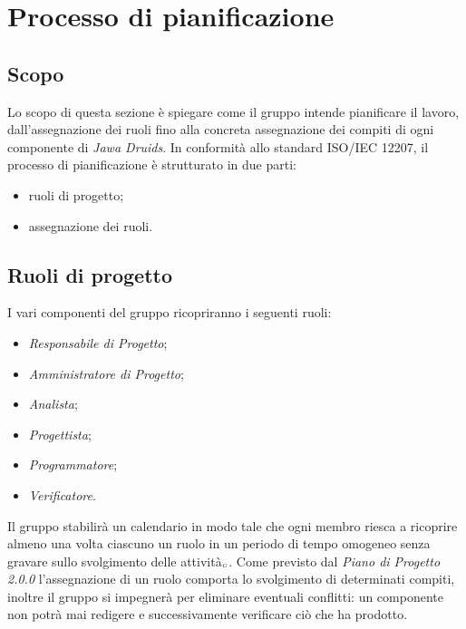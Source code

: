 \section{Processo di pianificazione}\label{ProcessiOrganizzativiProcessoDiPianificazione}

\subsection{Scopo}\label{ProcessiOrganizzativiProcessoDiPianificazioneScopo}

Lo scopo di questa sezione è spiegare come il gruppo intende pianificare il lavoro, dall'assegnazione dei ruoli fino alla concreta assegnazione dei compiti di ogni componente di \textit{Jawa Druids}. In conformità allo standard ISO/IEC 12207, il processo di pianificazione è strutturato in due parti:
\begin{itemize}
	\item ruoli di progetto;
	\item assegnazione dei ruoli.
\end{itemize}

\subsection{Ruoli di progetto}\label{ProcessiOrganizzativiProcessoDiPianificazioneRuoliDiProgetto}

I vari componenti del gruppo ricopriranno i seguenti ruoli:
\begin{itemize}
	\item \textit{Responsabile di Progetto};
	\item \textit{Amministratore di Progetto};
	\item \textit{Analista};
	\item \textit{Progettista};
	\item \textit{Programmatore};
	\item \textit{Verificatore}.
\end{itemize}

Il gruppo stabilirà un calendario in modo tale che ogni membro riesca a ricoprire almeno una volta ciascuno un ruolo in un periodo di tempo omogeneo senza gravare sullo svolgimento delle attività$_{\scaleto{G}{3pt}}$. Come previsto dal \textit{Piano di Progetto 2.0.0} l'assegnazione di un ruolo comporta lo svolgimento di determinati compiti, inoltre il gruppo si impegnerà per eliminare eventuali conflitti: un componente non potrà mai redigere e successivamente verificare ciò che ha prodotto.

